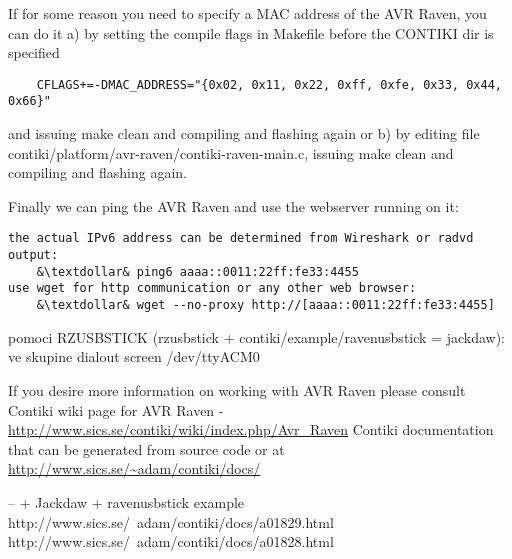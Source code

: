 \documentclass{article}
\begin{document}
If for some reason you need to specify a MAC address of the AVR Raven, you can do it
a) by setting the compile flags in Makefile before the CONTIKI dir is specified
\begin{lstlisting}
	CFLAGS+=-DMAC_ADDRESS="{0x02, 0x11, 0x22, 0xff, 0xfe, 0x33, 0x44, 0x66}"
\end{lstlisting}
and issuing make clean and compiling and flashing again
or
b) by editing file contiki/platform/avr-raven/contiki-raven-main.c,
issuing make clean and compiling and flashing again.


Finally we can ping the AVR Raven and use the webserver running on it:
\begin{lstlisting}
the actual IPv6 address can be determined from Wireshark or radvd output:
	&\textdollar& ping6 aaaa::0011:22ff:fe33:4455
use wget for http communication or any other web browser:
	&\textdollar& wget --no-proxy http://[aaaa::0011:22ff:fe33:4455]     
\end{lstlisting}
 


pomoci RZUSBSTICK (rzusbstick + contiki/example/ravenusbstick = jackdaw):
ve skupine dialout
screen /dev/ttyACM0



If you desire more information on working with AVR Raven please consult
Contiki wiki page for AVR Raven - \url{http://www.sics.se/contiki/wiki/index.php/Avr_Raven}
Contiki documentation that can be generated from source code or at \url{http://www.sics.se/~adam/contiki/docs/}

-- + Jackdaw + ravenusbstick example
http://www.sics.se/~adam/contiki/docs/a01829.html
http://www.sics.se/~adam/contiki/docs/a01828.html
\end{document}
